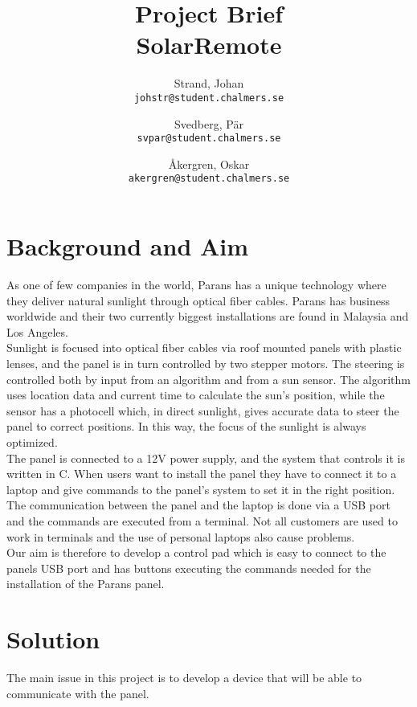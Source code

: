 \documentclass[a4paper]{article}
\author{    Strand, Johan \\ \texttt{johstr@student.chalmers.se} \and
            Svedberg, Pär\\ \texttt{svpar@student.chalmers.se} \and
            Åkergren, Oskar\\ \texttt{akergren@student.chalmers.se}
}
\title{\vspace{-3cm} Project Brief  \\ SolarRemote}
\begin{document}
	\maketitle

	\section*{Background and Aim} %
	\label{sec:background_and_aim}
    	As one of few companies in the world, Parans has a unique technology where they deliver natural sunlight through optical fiber cables. Parans has business worldwide and their two currently biggest installations are found in Malaysia and Los Angeles. \\

    	\noindent Sunlight is focused into optical fiber cables via roof mounted panels with plastic lenses, and the panel is in turn controlled by two stepper motors. The steering is controlled both by input from an algorithm and from a sun sensor. The algorithm uses location data and current time to calculate the sun's position, while the sensor has a photocell which, in direct sunlight, gives accurate data to steer the panel to correct positions. In this way, the focus of the sunlight is always optimized. \\

        \noindent The panel is connected to a 12V power supply, and the system that controls it is written in C. When users want to install the panel they have to connect it to a laptop and give commands to the panel's system to set it in the right position. \\
        
        \noindent The communication between the panel and the laptop is done via a USB port and the commands are executed from a terminal. Not all customers are used to work in terminals and the use of personal laptops also cause problems. \\

        \noindent Our aim is therefore to develop a control pad which is easy to connect to the panels USB port and has buttons executing the commands needed for the installation of the Parans panel.
        

    \section*{Solution} %
    \label{sec:solution}
        The main issue in this project is to develop a device that will be able to communicate with the panel. \\
\end{document}
